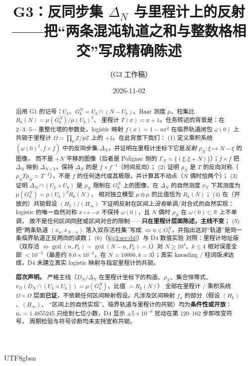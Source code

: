 \documentclass[11pt,a4paper]{article}
\newcommand{\Haar}{\mu}
\newcommand{\Om}{\Omega}               %
\newcommand{\ust}{u_{*}}
\theoremstyle{plain}
\theoremstyle{definition}
\begin{document}
\begin{CJK}{UTF8}{gbsn}

\title{G3：反同步集 $\Delta_N$ 与里程计上的反射\\[2pt]
\large ——{}把“两条混沌轨道之和与整数格相交”写成精确陈述}
\author{（G3 工作稿）}
\date{2026-11-02}
\maketitle

\begin{abstract}
沿用 G1 \cite{G1} 的记号：$U_k$、$G_k^N=U_k\cap(N-U_k)$、Haar 测度 $\Haar$、柱集比 $R_k(N)=\Haar(G_k^N)/\Haar(U_k)^2$、
里程计 $T(x)=x+1$。任务转述的背景是：在 $2\cdot3\cdot5\cdots$ 重整化塔的参数处，logistic 映射 $f(x)=1-ux^2$ 在临界轨道闭包
$\omega(0)$ 上共轭于里程计 $\Om=\prod_p\mathbb Z/p\mathbb Z$ 上的 $+1$。在此背景下我们：
(1) 定义乘积系统 $(\omega(0)^2,f\times f)$ 中的反同步集 $\Delta_N$，并证明在里程计坐标下它是\emph{反射} $\rho_N:\xi\mapsto N-\xi$ 的图像，
而不是 $+N$ 平移的图像（后者是 Polignac 侧的 $\Gamma_N=\{(\xi,\xi+N)\}$）；$f\times f$ 把 $\Delta_N$ 映到 $\Delta_{N+2}$，保持 $\Delta_N$ 的是
$f\times f^{-1}$（时间反向）；
(2) 证明 $\rho_N$ 是 $T$ 的反向对称（$\rho_NT\rho_N=T^{-1}$），不是 $f$ 的任何迭代或其极限，并计算其不动点（$N$ 偶时恰两个）；
(3) 证明 $\Delta_N\cap(U_k\times U_k)$ 是 $\rho_N$ 限制在 $G_k^N$ 上的图像，在 $\Delta_N$ 的自然测度 $\nu_N$ 下其测度为 $\Haar(G_k^N)=\Haar(U_k)^2R_k(N)$，
相对独立模型 $\Haar\otimes\Haar$ 的比值恰为 $R_k(N)$；
(4) 在（开放的）共轭假设 $(H_k)$/$(H_\infty)$ 下证明反射在区间上\emph{没有}单调/对合式的自然实现：logistic 的唯一自然对称 $x\mapsto-x$ 不保持 $\omega(0)$，且 $N$ 偶时 $\rho_N$ 在 $\omega(0)\subset\mathbb R$ 上不单调，
故不是任何区间同胚或区间对合的限制——\textbf{只在里程计层面陈述，主线不变}；
(5) 把“两条轨道 $(x_n,x_{N-n})$ 落入双存活柱集”写成 $\iff n\in G_k^N$，并指出这对“轨道”是同一条临界轨道正反两向的读数；
(6)（\S\ref{g3:sec:d4}）与 D4 数值实验 \cite{D4} 对照：里程计地址版（双存活 $\iff\gcd(n,P_k)=\gcd(N-n,P_k)=1$）对 $N\ge10^4$、$k\le4$
相对误差全部 $<10^{-3}$（最差约 $9.0\times10^{-4}$，在 $N=10000,k=3$）；真实 kneading / 柱词版\emph{未}达成，D4 未建立真实 logistic 映射与指定里程计的共轭。

\textbf{层次声明。} 严格主线（$D_N$/$\Delta_N$ 在里程计坐标下的构造、$\rho_N$、集合恒等式、$\nu_N(D_N\cap(U_k\times U_k))=\Haar(G_k^N)$、比值 $=R_k(N)$）
全部在里程计 / 乘积系统 $\Om\times\Om$ 层面\textbf{已证}，不依赖任何区间映射假设。凡涉及区间映射 $f_u$ 的部分（假设 $(H_k)$、$(H_\infty)$、
“区间上的自然实现”、临界轨道与里程计的共轭）均为\textbf{条件性或开放}：$\ust=1.4855245$ 只给到七位小数，D4 显示 $\pm5\times10^{-8}$ 扰动在第 120--162 步即改变符号，
周期检验与符号诊断均未支持宣称共轭。


\end{abstract}
\end{CJK}
\end{document}
